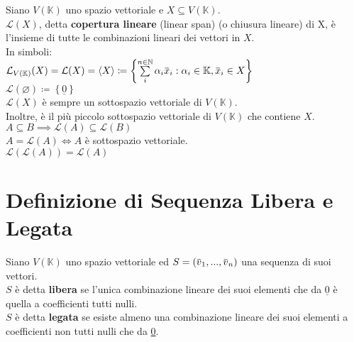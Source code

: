 \documentclass[a4paper, twoside, italian, 11pt]{book}
\newcommand{\braces}[1] {\left \{ #1 \right \}}
\newcommand{\overbar}[1] {\mkern 1.5mu\overline{\mkern-1.5mu#1\mkern-1.5mu}\mkern 1.5mu}
\newcommand{\N}{\mathbb N}
\newcommand{\K}{\mathbb K}
\let\emptyset\varnothing
\begin{document}
Siano $V(\K)$ uno spazio vettoriale e $X \subseteq V(\K)$. \\

\noindent
$\mathcal L(X)$, detta \textbf{copertura lineare} (linear span) (o chiusura lineare) di X, è l'insieme di tutte le combinazioni lineari dei vettori in $X$. \\

\noindent
In simboli: \\

$\mathcal L_{V(\K)}(X) = \mathcal L(X) = \left < X \right > \coloneqq \braces{\sum\limits_i^{n \in \N} \alpha_i \overbar x_i : \alpha_i \in \K, \overbar x_i \in X}$ \\

$\mathcal L(\emptyset) \coloneqq \braces{\underline 0}$ \\

\noindent
$\mathcal L(X)$ è sempre un sottospazio vettoriale di $V(\K)$. \\
Inoltre, è il più piccolo sottospazio vettoriale di $V(\K)$ che contiene $X$. \\


\noindent
$A \subseteq B \implies \mathcal L(A) \subseteq \mathcal L(B)$ \\
$A = \mathcal L(A) \iff A$ è sottospazio vettoriale. \\
$\mathcal L(\mathcal L(A)) = \mathcal L(A)$



\section{Definizione di Sequenza Libera e Legata}

Siano $V(\K)$ uno spazio vettoriale ed $S = (\overbar v_1, ..., \overbar v_n)$ una sequenza di suoi vettori. \\

\noindent
$S$ è detta \textbf{libera} se l'unica combinazione lineare dei suoi  elementi che da $\underline 0$ è quella a coefficienti tutti nulli. \\

\noindent
$S$ è detta \textbf{legata} se esiste almeno una combinazione lineare dei suoi elementi a coefficienti non tutti nulli che da {\underline 0}. \\
\end{document}
